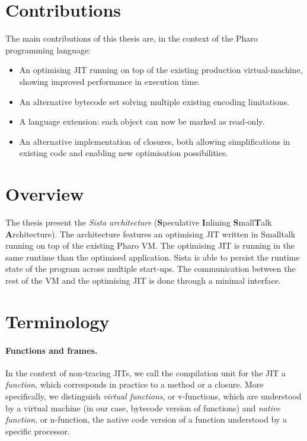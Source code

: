 \documentclass[a4paper,12pt,twoside]{../includes/ThesisStyle}
\begin{document}
\section{Contributions}

The main contributions of this thesis are, in the context of the Pharo programming language:
\begin{itemize}
	\item An optimising JIT running on top of the existing production virtual-machine, showing improved performance in execution time.
	\item An alternative bytecode set solving multiple existing encoding limitations.
	\item A language extension: each object can now be marked as read-only.
	\item An alternative implementation of closures, both allowing simplifications in existing code and enabling new optimisation possibilities.
\end{itemize}

\section{Overview}

The thesis present the \emph{Sista architecture} (\textbf{S}peculative \textbf{I}nlining \textbf{S}mall\textbf{T}alk \textbf{A}rchitecture). The architecture features an optimising JIT written in Smalltalk running on top of the existing Pharo VM. The optimising JIT is running in the same runtime than the optimised application. Sista is able to persist the runtime state of the program across multiple start-ups. The communication between the rest of the VM and the optimising JIT is done through a minimal interface.

\section{Terminology}

\paragraph{Functions and frames.} In the context of non-tracing JITs, we call the compilation unit for the JIT a \emph{function}, which corresponds in practice to a method or a closure. More specifically, we distinguish \emph{virtual functions}, or v-functions, which are understood by a virtual machine (in our case, bytecode version of functions) and \emph{native function}, or n-function, the native code version of a function understood by a specific processor. 
\end{document}
